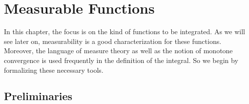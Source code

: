  
\chapter{Measurable Functions}
\label{cha:real-valued-random}

In this chapter, the focus is on the kind of functions to be 
integrated. As we will see later on, measurability is a
good characterization for these functions. Moreover, the language of
measure theory as well as the notion of monotone convergence is used
frequently in the definition of the integral. So we begin by formalizing
these necessary tools.

\section{Preliminaries}
\label{sec:preliminaries}




